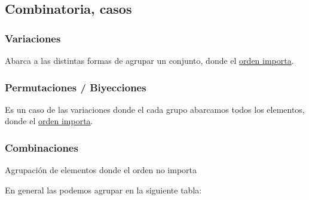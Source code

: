 \subsection{Combinatoria, casos}
\subsubsection{Variaciones}
\noindent Abarca a las distintas formas de agrupar un conjunto, donde el \underline{orden importa}.
\subsubsection{Permutaciones / Biyecciones}
\noindent Es un caso de las variaciones donde el cada grupo abarcamos todos los elementos, donde el \underline{orden importa}.
\subsubsection{Combinaciones}
\noindent Agrupación de elementos donde el orden no importa
\par \noindent En general las podemos agrupar en la siguiente tabla:
